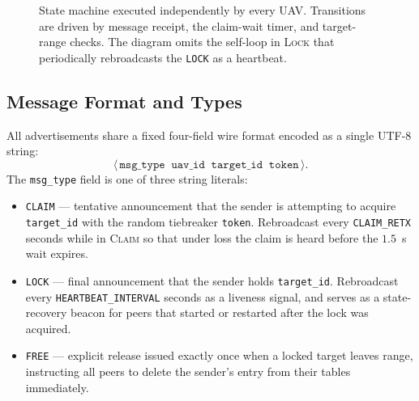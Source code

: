 \documentclass[11pt,letterpaper]{article}
\begin{document}
\begin{figure}[h]
\centering
{}
\caption{State machine executed independently by every UAV. Transitions
are driven by message receipt, the claim-wait timer, and target-range
checks. The diagram omits the self-loop in \textsc{Lock} that
periodically rebroadcasts the \texttt{LOCK} as a heartbeat.}
\label{fig:fsm}
\end{figure}

\subsection{Message Format and Types}
\label{sec:msgs}

All advertisements share a fixed four-field wire format encoded as a
single UTF-8 string:
\[
\langle\,\texttt{msg\_type}\;\;\texttt{uav\_id}\;\;\texttt{target\_id}\;\;\texttt{token}\,\rangle.
\]
The \texttt{msg\_type} field is one of three string literals:

\begin{itemize}
\item \texttt{CLAIM} --- tentative announcement that the sender is
attempting to acquire \texttt{target\_id} with the random tiebreaker
\texttt{token}. Rebroadcast every \texttt{CLAIM\_RETX} seconds while in
\textsc{Claim} so that under loss the claim is heard before the
$1.5$~s wait expires.
\item \texttt{LOCK} --- final announcement that the sender holds
\texttt{target\_id}. Rebroadcast every \texttt{HEARTBEAT\_INTERVAL}
seconds as a liveness signal, and serves as a state-recovery beacon for
peers that started or restarted after the lock was acquired.
\item \texttt{FREE} --- explicit release issued exactly once when a
locked target leaves range, instructing all peers to delete the
sender's entry from their tables immediately.
\end{itemize}
\end{document}
